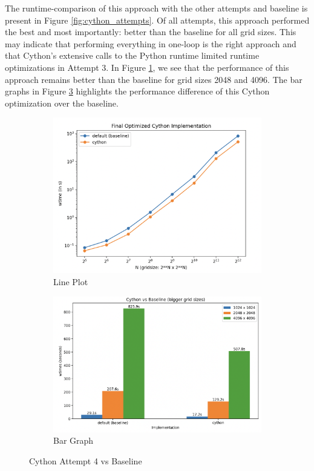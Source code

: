 \documentclass[a4paper,10pt]{article}
\begin{document}
The runtime-comparison of this approach with the other attempts and baseline is present in Figure \ref{fig:cython_attempts}.
Of all attempts, this approach performed the best and most importantly: better than the baseline for all grid sizes.
This may indicate that performing everything in one-loop is the right approach and that Cython's extensive calls to the Python runtime limited runtime optimizations in Attempt 3.
In Figure \ref{fig:cython_final_plot}, we see that the performance of this approach remains better than the baseline for grid sizes 2048 and 4096.
The bar graphs in Figure \ref{fig:cython_final_bar} highlights the performance difference of this Cython optimization over the baseline.
\begin{figure}[t]
     \centering
     \begin{subfigure}[b]{0.45\textwidth}
         \centering
         \includegraphics[width=\linewidth]{images/cython/cython_final_plot.png}
         \caption{Line Plot}
         \label{fig:cython_final_plot}
     \end{subfigure}
     \hfill
     \begin{subfigure}[b]{0.45\textwidth}
        \centering
        \includegraphics[width=\linewidth]{images/cython/cython_final_bar.png}
        \caption{Bar Graph}
        \label{fig:cython_final_bar}
     \end{subfigure}
  \caption{Cython Attempt 4 vs Baseline}
\end{figure}
\end{document}
